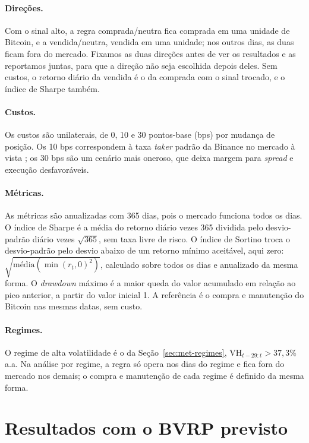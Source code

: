 \paragraph{Direções.} Com o sinal alto, a regra comprada/neutra fica comprada
em uma unidade de Bitcoin, e a vendida/neutra, vendida em uma unidade; nos
outros dias, as duas ficam fora do mercado. Fixamos as duas
direções antes de ver os resultados e as reportamos juntas, para que a direção
não seja escolhida depois deles. Sem custos, o retorno diário da vendida é o da
comprada com o sinal trocado, e o índice de Sharpe também.

\paragraph{Custos.} Os custos são unilaterais, de 0, 10 e 30 pontos-base
(bps) por mudança de posição. Os 10 bps correspondem à taxa \textit{taker}
padrão da Binance no mercado à vista \citep{Binance2024fees}; os 30 bps são um
cenário mais oneroso, que deixa margem para \textit{spread} e execução
desfavoráveis.

\paragraph{Métricas.} As métricas são anualizadas com 365 dias, pois o mercado
funciona todos os dias. O índice de Sharpe \citep{sharpe1994sharpe} é a média
do retorno diário vezes 365 dividida pelo desvio-padrão diário vezes
$\sqrt{365}$, sem taxa livre de risco. O índice de Sortino
\citep{sortino1994performance} troca o desvio-padrão pelo desvio abaixo de um
retorno mínimo aceitável, aqui zero: $\sqrt{\text{média}(\min(r_t, 0)^2)}$,
calculado sobre todos os dias e anualizado da mesma forma. O
\textit{drawdown} máximo é a maior queda do valor acumulado em relação ao pico
anterior, a partir do valor inicial 1. A referência é o compra e manutenção do
Bitcoin nas mesmas datas, sem custo.

\paragraph{Regimes.} O regime de alta volatilidade é o da
Seção~\ref{sec:met-regimes}, $\text{VH}_{t-29:t} > 37{,}3\%$ a.a. Na análise
por regime, a regra só opera nos dias do regime e fica fora do mercado nos
demais; o compra e manutenção de cada regime é definido da mesma forma.

\section{Resultados com o BVRP previsto}
\label{sec:estr-principal}

